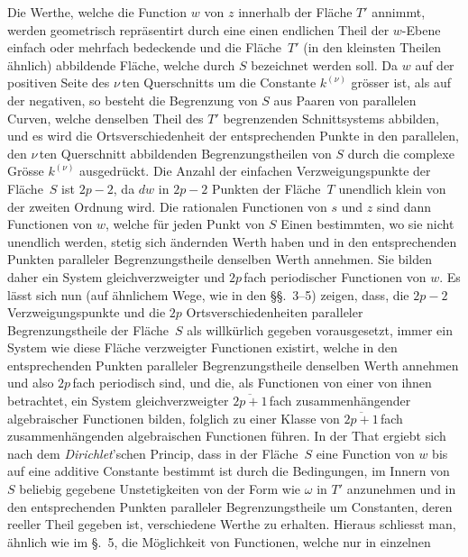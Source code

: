 \documentclass[a4paper,12pt,leqno]{article}
\begin{document}
Die Werthe, welche die Function $w$ von $z$ innerhalb der
Fl\"{a}che $T'$ annimmt, werden geometrisch repr\"{a}sentirt durch
eine einen endlichen Theil der $w$-Ebene einfach oder mehrfach
bedeckende und die Fl\"{a}che~$T'$ (in den kleinsten Theilen
\"{a}hnlich) abbildende Fl\"{a}che, welche durch $S$ bezeichnet
werden soll.  Da $w$ auf der positiven Seite des $\nu \,$\-ten
Querschnitts um die Constante $k^{(\nu)}$ gr\"{o}sser ist, als
auf der negativen, so besteht die Begrenzung von $S$ aus Paaren
von parallelen Curven, welche denselben Theil des $T'$
begrenzenden Schnittsystems abbilden, und es wird die
Ortsverschiedenheit der entsprechenden Punkte in den parallelen,
den $\nu \,$\-ten Querschnitt abbildenden Begrenzungstheilen von $S$
durch die complexe Gr\"{o}sse $k^{(\nu)}$ ausgedr\"{u}ckt.  Die
Anzahl der einfachen Verzweigungspunkte der Fl\"{a}che~$S$ ist
$2p - 2$, da $dw$ in $2p - 2$ Punkten der Fl\"{a}che~$T$
unendlich klein von der zweiten Ordnung wird.  Die rationalen
Functionen von $s$ und $z$ sind dann Functionen von $w$, welche
f\"{u}r jeden Punkt von $S$ Einen bestimmten, wo sie nicht
unendlich werden, stetig sich \"{a}ndernden Werth haben und in
den entsprechenden Punkten paralleler Begrenzungstheile denselben
Werth annehmen.  Sie bilden daher ein System gleichverzweigter
und $2p \,$\-fach periodischer Functionen von $w$.  Es l\"{a}sst
sich nun (auf \"{a}hnlichem Wege, wie in den \S\S.~3--5) zeigen,
dass, die $2p - 2$ Verzweigungspunkte und die $2p$
Ortsverschiedenheiten paralleler Begrenzungs\-theile der
Fl\"{a}che~$S$ als willk\"{u}rlich gegeben vorausgesetzt, immer
ein System wie diese Fl\"{a}che verzweigter Functionen existirt,
welche in den entsprechenden Punkten paralleler Begrenzungstheile
denselben Werth annehmen und also $2p \,$\-fach periodisch sind, und
die, als Functionen von einer von ihnen betrachtet, ein System
gleichverzweigter $\overline{2p + 1} \,$\-fach zusammenh\"{a}ngender
algebraischer Functionen bilden, folglich zu einer Klasse von
$\overline{2p + 1} \,$\-fach zusammenh\"{a}ngenden algebraischen
Functionen f\"{u}hren.  In der That ergiebt sich nach dem
\emph{Dirichlet}'schen Princip, dass in der Fl\"{a}che~$S$ eine
Function von $w$ bis auf eine additive Constante bestimmt ist
durch die Bedingungen, im Innern von $S$ beliebig gegebene
Unstetigkeiten von der Form wie $\omega$ in $T'$ anzunehmen und
in den entsprechenden Punkten paralleler Begrenzungstheile um
Constanten, deren reeller Theil gegeben ist, verschiedene Werthe
zu erhalten.  Hieraus schliesst man, \"{a}hnlich wie im \S.~5,
die M\"{o}glichkeit von Functionen, welche nur in einzelnen
\end{document}
